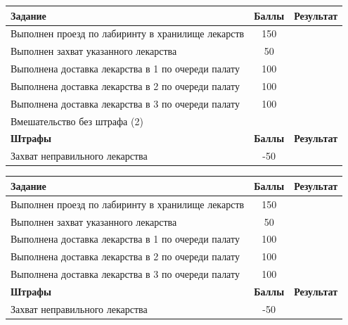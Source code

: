 \documentclass[12pt]{article}
\newcommand{\penaltyOne}{\color{red}-50}
\newcommand{\namePenaltyOne}{Захват неправильного лекарства}
\newcommand{\taskOne}{150}
\newcommand{\nameTaskOne}{Выполнен проезд по лабиринту в хранилище лекарств}
\newcommand{\taskSecond}{50}
\newcommand{\nameTaskSecond}{Выполнен захват указанного лекарства}
\newcommand{\taskThird}{100}
\newcommand{\nameTaskThird}{Выполнена доставка лекарства в 1 по очереди палату}
\newcommand{\taskFourth}{100}
\newcommand{\nameTaskFourth}{Выполнена доставка лекарства в 2 по очереди палату}
\newcommand{\taskFifth}{100}
\newcommand{\nameTaskFifth}{Выполнена доставка лекарства в 3 по очереди палату}
\begin{document}
\vspace*{0.25cm}
\begin{tabularx}{\textwidth}{|X|c|p{2cm}|}
    \hline
    \textbf{Задание} & \textbf{Баллы} & \textbf{Результат}\\
    \hline
    \nameTaskOne & \taskOne &  \\
    \hline
    \nameTaskSecond & \taskSecond & \\
    \hline
    \nameTaskThird & \taskThird & \\
    \hline 
    \nameTaskFourth & \taskFourth & \\
    \hline
    \nameTaskFifth & \taskFifth & \\
    \hline
    Вмешательство без штрафа (2) & & \\
    \hline
    \textbf{Штрафы} & \textbf{Баллы} & \textbf{Результат} \\
    \hline
    \namePenaltyOne & \penaltyOne &  \\
    \hline
\end{tabularx}
\vspace*{0.25cm}

\vspace*{0.25cm}
\begin{tabularx}{\textwidth}{|X|c|p{2cm}|}
    \hline
    \textbf{Задание} & \textbf{Баллы} & \textbf{Результат}\\
    \hline
    \nameTaskOne & \taskOne &  \\
    \hline
    \nameTaskSecond & \taskSecond & \\
    \hline
    \nameTaskThird & \taskThird & \\
    \hline 
    \nameTaskFourth & \taskFourth & \\
    \hline
    \nameTaskFifth & \taskFifth & \\
    \hline
    \textbf{Штрафы} & \textbf{Баллы} & \textbf{Результат} \\
    \hline
    \namePenaltyOne & \penaltyOne &  \\
    \hline
\end{tabularx}
\vspace*{1cm}

\end{document}
